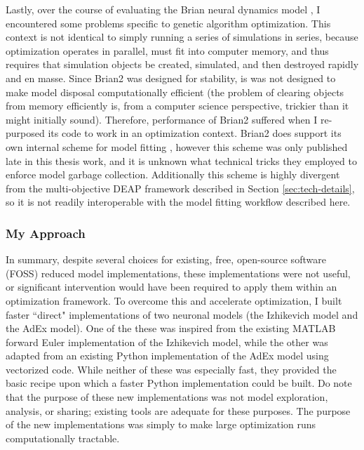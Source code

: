 Lastly, over the course of evaluating the Brian neural dynamics model \citep{gerstner2014neuronal}, I encountered some problems specific to genetic algorithm optimization.
This context is not identical to simply running a series of simulations in series, because optimization operates in parallel, must fit into computer memory, and thus requires that simulation objects be created, simulated, and then destroyed rapidly and en masse.
Since Brian2 was designed for stability, is was not designed to make model disposal computationally efficient (the problem of clearing objects from memory efficiently is, from a computer science perspective, trickier than it might initially sound).
Therefore, performance of Brian2 suffered when I re-purposed its code to work in an optimization context.
Brian2 does support its own internal scheme for model fitting \citep{brian2modelfitting}, however this scheme was only published late in this thesis work, and it is unknown what technical tricks they employed to enforce model garbage collection. 
Additionally this scheme is highly divergent from the multi-objective DEAP framework described in Section \ref{sec:tech-details}, so it is not readily interoperable with the model fitting workflow described here.

\subsubsection{My Approach}
In summary, despite several choices for existing, free, open-source software (FOSS) reduced model
implementations, these implementations were not useful, or significant intervention would have been required to apply them within an optimization framework.
To overcome this and accelerate optimization, I built faster ``direct" implementations of two neuronal models (the Izhikevich model and the AdEx model).
One of the these was inspired from the existing MATLAB forward Euler implementation of the Izhikevich model, while the other was adapted from an existing Python implementation of the AdEx model using vectorized code.
While neither of these was especially fast, they provided the basic recipe upon which a faster Python implementation could be built.
Do note that the purpose of these new implementations was not model exploration, analysis, or sharing; existing tools are adequate for these purposes.
The purpose of the new implementations was simply to make large optimization runs computationally tractable.

